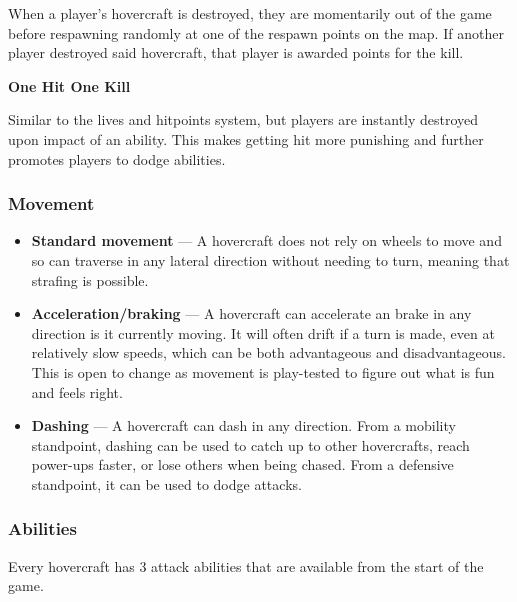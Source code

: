 \documentclass{article}
\theoremstyle{definition}
\begin{document}
When a player's hovercraft is destroyed, they are momentarily out of the game
before respawning randomly at one of the respawn points on the map. If another
player destroyed said hovercraft, that player is awarded points for the kill.

\textbf{One Hit One Kill}

Similar to the lives and hitpoints system, but players are instantly destroyed
upon impact of an ability. This makes getting hit more punishing and further
promotes players to dodge abilities.


\subsubsection{Movement}

\begin{itemize}
  \item \textbf{Standard movement} --- A hovercraft does not rely on wheels to
    move and so can traverse in any lateral direction without needing to turn,
    meaning that strafing is possible.
  \item \textbf{Acceleration/braking} --- A hovercraft can accelerate an brake
    in any direction is it currently moving. It will often drift if a turn is
    made, even at relatively slow speeds, which can be both advantageous and
    disadvantageous. This is open to change as movement is play-tested to
    figure out what is fun and feels right.
  \item \textbf{Dashing} --- A hovercraft can dash in any direction. From
    a mobility standpoint, dashing can be used to catch up to other
    hovercrafts, reach power-ups faster, or lose others when being chased. From
    a defensive standpoint, it can be used to dodge attacks.
\end{itemize}

\subsubsection{Abilities}

Every hovercraft has 3 attack abilities that are available from the start of
the game.
\end{document}
